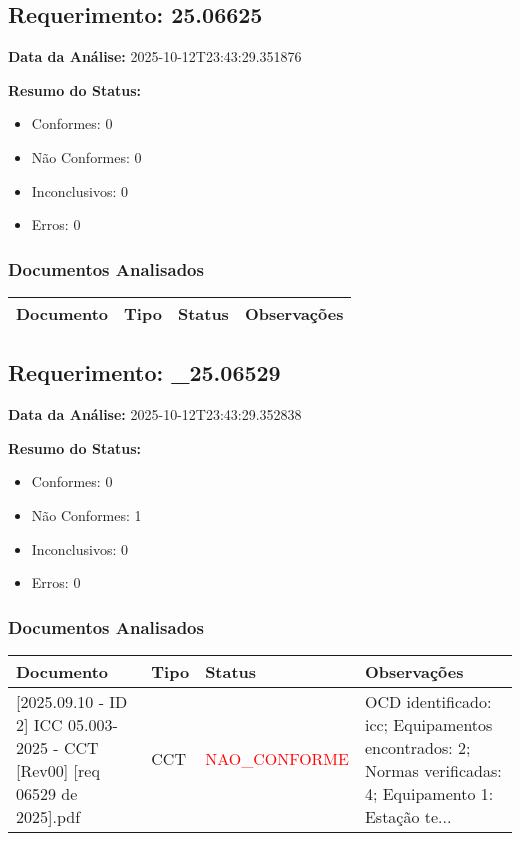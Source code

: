 \documentclass[12pt,a4paper]{article}
\begin{document}
\subsection{Requerimento: 25.06625}

\textbf{Data da Análise:} 2025-10-12T23:43:29.351876

\textbf{Resumo do Status:}
\begin{itemize}
    \item Conformes: 0
    \item Não Conformes: 0
    \item Inconclusivos: 0
    \item Erros: 0
\end{itemize}

\subsubsection{Documentos Analisados}

\begin{longtable}{|p{4cm}|p{2cm}|p{2cm}|p{6cm}|}
\hline
\textbf{Documento} & \textbf{Tipo} & \textbf{Status} & \textbf{Observações} \\
\hline
\endhead
\end{longtable}


\subsection{Requerimento: \_25.06529}

\textbf{Data da Análise:} 2025-10-12T23:43:29.352838

\textbf{Resumo do Status:}
\begin{itemize}
    \item Conformes: 0
    \item Não Conformes: 1
    \item Inconclusivos: 0
    \item Erros: 0
\end{itemize}

\subsubsection{Documentos Analisados}

\begin{longtable}{|p{4cm}|p{2cm}|p{2cm}|p{6cm}|}
\hline
\textbf{Documento} & \textbf{Tipo} & \textbf{Status} & \textbf{Observações} \\
\hline
\endhead
[Certificado de Conformidade Técnica - CCT][2025.09.10 - ID 2] ICC 05.003-2025 - CCT [Rev00] [req 06529 de 2025].pdf & CCT & \textcolor{red}{NAO\_CONFORME} & OCD identificado: icc; Equipamentos encontrados: 2; Normas verificadas: 4; Equipamento 1: Estação te... \\
\hline
\end{longtable}
\end{document}
